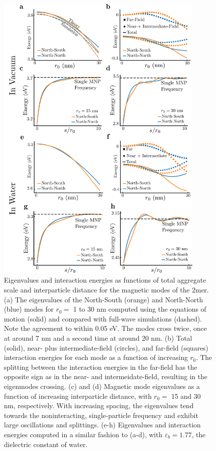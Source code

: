 \documentclass[journal=apchd5,manuscript=article]{achemso}
\begin{document}
\begin{figure}
\includegraphics[width=4in]{2mer_eig_combined.pdf}
\caption{Eigenvalues and interaction energies as functions of total aggregate scale and interparticle distance for the magnetic modes of the 2mer. (a) The eigenvalues of the North-South (orange) and North-North (blue) modes for $r_0 = $ 1 to 30 nm computed using the equations of motion (solid) and compared with full-wave simulations (dashed). Note the agreement to within 0.05 eV. The modes cross twice, once at around 7 nm and a second time at around 20 nm. (b) Total (solid), near- plus intermediate-field (circles), and far-field (squares) interaction energies for each mode as a function of increasing $r_0$. The splitting between the interaction energies in the far-field has the opposite sign as in the near- and intermeidate-field, resulting in the eigenmodes crossing. (c) and (d) Magnetic mode eigenvalues as a function of increasing interparticle distance, with $r_0 =$ 15 and 30 nm, respectively. With increasing spacing, the eigenvalues tend towards the noninteracting, single-particle frequency and exhibit large oscillations and splittings. (e-h) Eigenvalues and interaction energies computed in a similar fashion to (a-d), with $\varepsilon_b = 1.77$, the dielectric constant of water.}
\label{scaling}
\end{figure}
\end{document}

